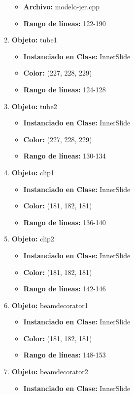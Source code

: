 \documentclass[10pt, a4paper]{article}
\begin{document}
\begin{enumerate}
\begin{itemize}
		\item \textbf{Archivo:} modelo-jer.cpp
		\item \textbf{Rango de líneas:} 122-190
	\end{itemize}
	\item \textbf{Objeto:} tube1
	\begin{itemize}
		\item \textbf{Instanciado en Clase:} InnerSlide
		\item \textbf{Color:} (227, 228, 229)
		\item \textbf{Rango de líneas:} 124-128
	\end{itemize}
	\item \textbf{Objeto:} tube2
	\begin{itemize}
		\item \textbf{Instanciado en Clase:} InnerSlide
		\item \textbf{Color:} (227, 228, 229)
		\item \textbf{Rango de líneas:} 130-134
	\end{itemize}
	\item \textbf{Objeto:} clip1
	\begin{itemize}
		\item \textbf{Instanciado en Clase:} InnerSlide
		\item \textbf{Color:} (181, 182, 181)
		\item \textbf{Rango de líneas:} 136-140
	\end{itemize}
	\item \textbf{Objeto:} clip2
	\begin{itemize}
		\item \textbf{Instanciado en Clase:} InnerSlide
		\item \textbf{Color:} (181, 182, 181)
		\item \textbf{Rango de líneas:} 142-146
	\end{itemize}
	\item \textbf{Objeto:} beamdecorator1
	\begin{itemize}
		\item \textbf{Instanciado en Clase:} InnerSlide
		\item \textbf{Color:} (181, 182, 181)
		\item \textbf{Rango de líneas:} 148-153
	\end{itemize}
	\item \textbf{Objeto:} beamdecorator2
	\begin{itemize}
		\item \textbf{Instanciado en Clase:} InnerSlide

\end{itemize}
\end{enumerate}
\end{document}
